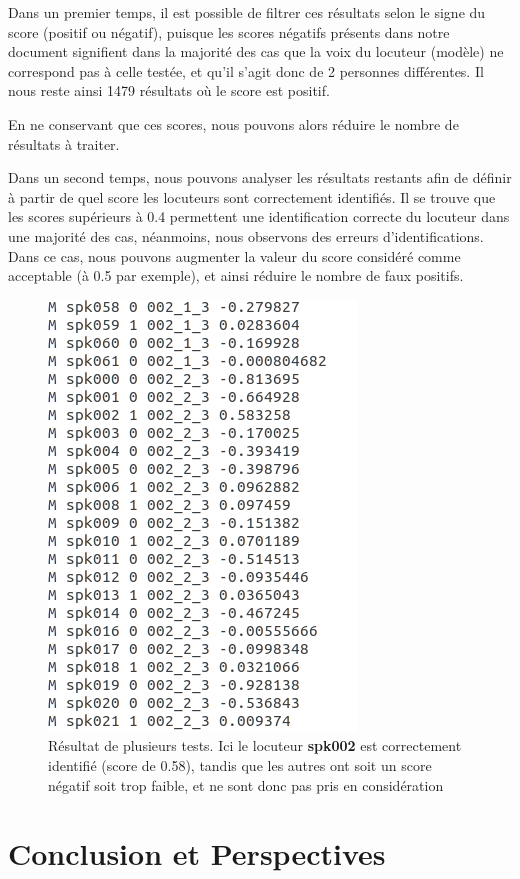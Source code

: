 \documentclass[a4paper, 12pt]{book}
\begin{document}
Dans un premier temps, il est possible de filtrer ces résultats selon le signe du score (positif ou négatif), puisque les scores négatifs présents dans notre document signifient dans la majorité des cas que la voix du locuteur (modèle) ne correspond pas à celle testée, et qu'il s'agit donc de 2 personnes différentes. Il nous reste ainsi 1479 résultats où le score est positif.

En ne conservant que ces scores, nous pouvons alors réduire le nombre de résultats à traiter.

Dans un second temps, nous pouvons analyser les résultats restants afin de définir à partir de quel score les locuteurs sont correctement identifiés. Il se trouve que les scores supérieurs à 0.4 permettent une identification correcte du locuteur dans une majorité des cas, néanmoins, nous observons des erreurs d'identifications. Dans ce cas, nous pouvons augmenter la valeur du score considéré comme acceptable (à 0.5 par exemple), et ainsi réduire le nombre de faux positifs.

\begin{figure}[htbp]
  \centering
  \includegraphics[width=0.5\linewidth]{images/badResultExample.png}
  \caption{Résultat de plusieurs tests. Ici le locuteur \textbf{spk002} est correctement identifié (score de 0.58), tandis que les autres ont soit un score négatif soit trop faible, et ne sont donc pas pris en considération}
\end{figure}


\chapter{Conclusion et Perspectives\label{chap-conclusion}}
\end{document}
